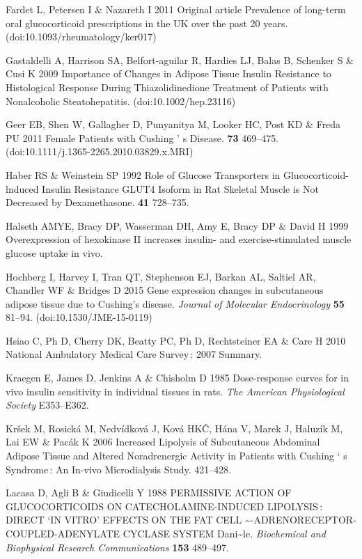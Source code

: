 \documentclass[11pt]{article} %
\begin{document}
Fardet L, Petersen I \& Nazareth I 2011 Original article Prevalence of
long-term oral glucocorticoid prescriptions in the UK over the past 20
years. (doi:10.1093/rheumatology/ker017)

Gastaldelli A, Harrison SA, Belfort-aguilar R, Hardies LJ, Balas B,
Schenker S \& Cusi K 2009 Importance of Changes in Adipose Tissue
Insulin Resistance to Histological Response During Thiazolidinedione
Treatment of Patients with Nonalcoholic Steatohepatitis.
(doi:10.1002/hep.23116)

Geer EB, Shen W, Gallagher D, Punyanitya M, Looker HC, Post KD \& Freda
PU 2011 Female Patients with Cushing ' s Disease. \textbf{73} 469--475.
(doi:10.1111/j.1365-2265.2010.03829.x.MRI)

Haber RS \& Weinstein SP 1992 Role of Glucose Transporters in
Glucocorticoid-lnduced Insulin Resistance GLUT4 Isoform in Rat Skeletal
Muscle is Not Decreased by Dexamethasone. \textbf{41} 728--735.

Halseth AMYE, Bracy DP, Wasserman DH, Amy E, Bracy DP \& David H 1999
Overexpression of hexokinase II increases insulin- and
exercise-stimulated muscle glucose uptake in vivo.

Hochberg I, Harvey I, Tran QT, Stephenson EJ, Barkan AL, Saltiel AR,
Chandler WF \& Bridges D 2015 Gene expression changes in subcutaneous
adipose tissue due to Cushing's disease. \emph{Journal of Molecular
Endocrinology} \textbf{55} 81--94. (doi:10.1530/JME-15-0119)

Hsiao C, Ph D, Cherry DK, Beatty PC, Ph D, Rechtsteiner EA \& Care H
2010 National Ambulatory Medical Care Survey : 2007 Summary.

Kraegen E, James D, Jenkins A \& Chisholm D 1985 Dose-response curves
for in vivo insulin sensitivity in individual tissues in rats. \emph{The
American Physiological Society} E353--E362.

Kršek M, Rosická M, Nedvídková J, Ková HKČ, Hána V, Marek J, Haluzík M,
Lai EW \& Pacák K 2006 Increased Lipolysis of Subcutaneous Abdominal
Adipose Tissue and Altered Noradrenergic Activity in Patients with
Cushing ` s Syndrome : An In-vivo Microdialysis Study. 421--428.

Lacasa D, Agli B \& Giudicelli Y 1988 PERMISSIVE ACTION OF
GLUCOCORTICOIDS ON CATECHOLAMINE-INDUCED LIPOLYSIS : DIRECT `IN VITRO'
EFFECTS ON THE FAT CELL
\textasciitilde{}-ADRENORECEPTOR-COUPLED-ADENYLATE CYCLASE SYSTEM
Dani\textasciitilde{}le. \emph{Biochemical and Biophysical Research
Communications} \textbf{153} 489--497.
\end{document}
